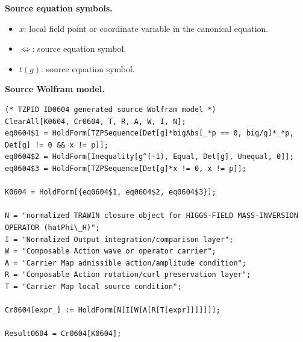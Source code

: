 \begin{minipage}[t]{0.49\linewidth}
\begingroup
\small
\raggedright
\textbf{Source equation symbols.}\par
\begin{itemize}[leftmargin=1.35em,itemsep=1pt,topsep=1pt,parsep=0pt]
    \item $x$: local field point or coordinate variable in the canonical equation.
    \item $\iff$: source equation symbol.
    \item $t(g)$: source equation symbol.
\end{itemize}
\endgroup
\end{minipage}\hfill
\begin{minipage}[t]{0.47\linewidth}
\begingroup
\scriptsize
\raggedright
\textbf{Source Wolfram model.}\par
\begin{Verbatim}[fontsize=\tiny,breaklines=true,breakanywhere=true]
(* TZPID ID0604 generated source Wolfram model *)
ClearAll[K0604, Cr0604, T, R, A, W, I, N];
eq0604$1 = HoldForm[TZPSequence[Det[g]*bigAbs[_*p == 0, big/g]*_*p, Det[g] != 0 && x != p]];
eq0604$2 = HoldForm[Inequality[g^(-1), Equal, Det[g], Unequal, 0]];
eq0604$3 = HoldForm[TZPSequence[Det[g]*x != 0, x != p]];

K0604 = HoldForm[{eq0604$1, eq0604$2, eq0604$3}];

N = "normalized TRAWIN closure object for HIGGS-FIELD MASS-INVERSION OPERATOR (hatPhi\_H)";
I = "Normalized Output integration/comparison layer";
W = "Composable Action wave or operator carrier";
A = "Carrier Map admissible action/amplitude condition";
R = "Composable Action rotation/curl preservation layer";
T = "Carrier Map local source condition";

Cr0604[expr_] := HoldForm[N[I[W[A[R[T[expr]]]]]]];

Result0604 = Cr0604[K0604];
\end{Verbatim}
\endgroup
\end{minipage}

